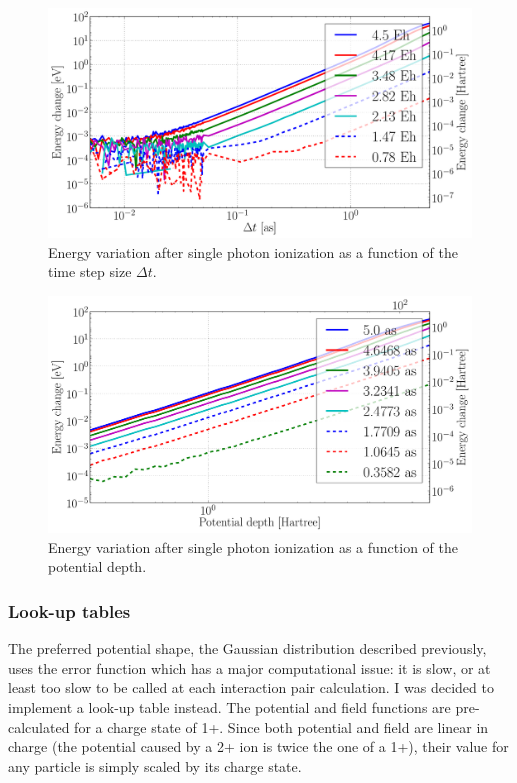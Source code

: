 \begin{figure}
 \centering
 \includegraphics[width=\figurewidth]{figures/numerical_heating_dt}
 \caption{\label{fig:potential:heating:dt}Energy variation after single photon
          ionization as a function of the time step size $\Delta t$.}
\end{figure}

\begin{figure}
 \centering
 \includegraphics[width=\figurewidth]{figures/numerical_heating_D}
 \caption{\label{fig:potential:heating:depth}Energy variation after single photon
          ionization as a function of the potential depth.}
\end{figure}


\subsubsection{Look-up tables}
\label{section:intro:md:potentials:lut}

The preferred potential shape, the Gaussian distribution described previously,
uses the error function which has a major
computational issue: it is slow, or at least too slow to be called at each interaction pair
calculation. I was decided to implement a look-up table instead.
The potential and field functions are pre-calculated for a charge state of 1+.
Since both potential and field are linear in charge (the potential caused by a 2+
ion is twice the one of a 1+), their value for any
particle is simply scaled by its charge state.

